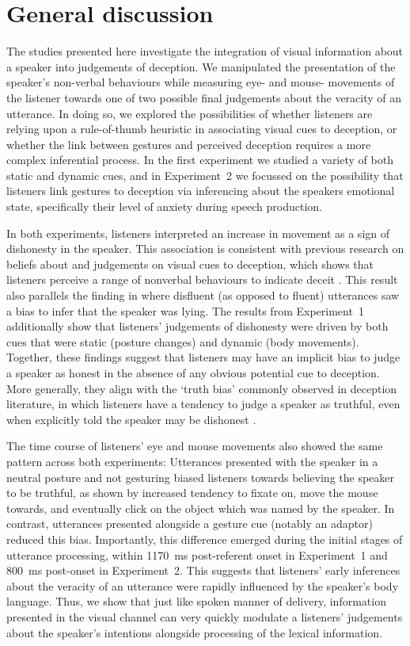 \documentclass[a4paper,man,natbib]{apa6}
\begin{document}
\section{General discussion}
The studies presented here investigate the integration of visual information about a speaker into judgements of deception.
We manipulated the presentation of the speaker's non-verbal behaviours while measuring eye- and mouse- movements of the listener towards one of two possible final judgements about the veracity of an utterance.
In doing so, we explored the possibilities of whether listeners are relying upon a rule-of-thumb heuristic in associating visual cues to deception, or whether the link between gestures and perceived deception requires a more complex inferential process.
In the first experiment we studied a variety of both static and dynamic cues, and in Experiment~2 we focussed on the possibility that listeners link gestures to deception via inferencing about the speakers emotional state, specifically their level of anxiety during speech production.

In both experiments, listeners interpreted an increase in movement as a sign of dishonesty in the speaker.
This association is consistent with previous research on beliefs about and judgements on visual cues to deception, which shows that listeners perceive a range of nonverbal behaviours to indicate deceit \citep[e.g.][]{Zuckerman1981, Akehurst1996, Vrij2000}.
This result also parallels the finding in \citet{Loy2017} where disfluent (as opposed to fluent) utterances saw a bias to infer that the speaker was lying. 
The results from Experiment~1 additionally show that listeners' judgements of dishonesty were driven by both cues that were static (posture changes) and dynamic (body movements). 
Together, these findings suggest that listeners may have an implicit bias to judge a speaker as honest in the absence of any obvious potential cue to deception. 
More generally, they align with the `truth bias' commonly observed in deception literature, in which listeners have a tendency to judge a speaker as truthful, even when explicitly told the speaker may be dishonest \citep{Vrij2000}.

The time course of listeners' eye and mouse movements also showed the same pattern across both experiments:
Utterances presented with the speaker in a neutral posture and not gesturing biased listeners towards believing the speaker to be truthful, as shown by increased tendency to fixate on, move the mouse towards, and eventually click on the object which was named by the speaker. 
In contrast, utterances presented alongside a gesture cue (notably an adaptor) reduced this bias.
Importantly, this difference emerged during the initial stages of utterance processing, within 1170~ms post-referent onset in Experiment~1 and 800~ms post-onset in Experiment~2.
This suggests that listeners' early inferences about the veracity of an utterance were rapidly influenced by the speaker's body language.
Thus, we show that just like spoken manner of delivery, information presented in the visual channel can very quickly modulate a listeners' judgements about the speaker's intentions alongside processing of the lexical information. 
\end{document}
